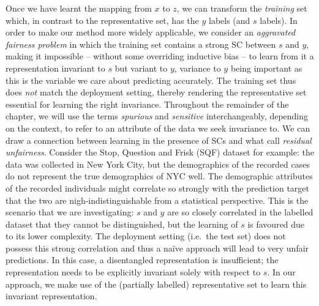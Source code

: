 Once we have learnt the mapping from $x$ to $z$, we can transform the \emph{training} set
which, in contrast to the representative set, has the $y$ labels (and $s$ labels). 
%
In order to make our method more widely applicable, we consider an \emph{aggravated fairness
problem} in which the training set contains a strong \acf{SC} between $s$ and $y$, making it
impossible -- without some overriding inductive bias -- to learn from it a representation invariant
to $s$ but variant to $y$, variance to $y$ being important as this is the variable we care about
predicting accurately. 
%
The training set thus does \emph{not} match the deployment setting, thereby rendering the
representative set essential for learning the right invariance.
Throughout the remainder of the chapter, we will use the terms \emph{spurious} and \emph{sensitive}
interchangeably, depending on the context, to refer to an attribute of the data we seek invariance
to.
We can draw a connection between learning in the presence of \acp{SC} and what
\citet{kallus2018residual} call \emph{residual unfairness}. 
%
Consider the Stop, Question and Frisk (SQF) dataset for example: the data was collected in New York
City, but the demographics of the recorded cases do not represent the true demographics of NYC
well. 
%
The demographic attributes of the recorded individuals might correlate so strongly with the
prediction target that the two are nigh-indistinguishable from a statistical perspective. 
%
This is the scenario that we are investigating: $s$ and $y$ are so closely correlated in the
labelled dataset that they cannot be distinguished, but the learning of
$s$ is favoured due to its lower complexity.
%
The deployment setting (i.e.\ the test set) does not possess this strong correlation and thus a
na\"ive approach will lead to very unfair predictions. 
%
In this case, a disentangled representation is insufficient; the representation needs to be
explicitly invariant solely with respect to $s$. 
%
In our approach, we make use of the (partially labelled) representative set to learn this invariant
representation.


